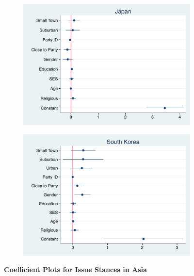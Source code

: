 \documentclass[12pt, titlepage]{article}
\newcommand\tb{\textbf}
\begin{document}
\begin{figure}[H]
	\centering
	\begin{subfigure}[b]{0.475\textwidth}
		\centering
		\includegraphics[width=\textwidth]{LibCoef/Japan}
	\end{subfigure}
	\hfill
	\begin{subfigure}[b]{0.475\textwidth}  
		\centering 
		\includegraphics[width=\textwidth]{LibCoef/SKorea}
	\end{subfigure}
	\caption[ \tb{Issue Stances - Asia} ]
	{\tb {Coefficient Plots for Issue Stances in Asia} }
	\label{AsiaLibCoef}
\end{figure}
\end{document}
